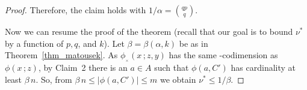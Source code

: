 \documentclass[scombinatorics.tex]{subfiles}
\begin{document}
\begin{proof}

Therefore, the claim holds with $\displaystyle1/\alpha={qp\choose q}$.

Now we can resume the proof of the theorem (recall that our goal is to bound $\nu^*$ by a function of $p,q$, and $k$).
Let $\beta=\beta(\alpha,k)$ be as in Theorem~\ref{thm_matousek}.
As $\phi\!_{_\times}\!(x\,;z,y)$ has the same \vc-codimension as $\phi(x\,;z)$, by Claim~2 there is an $a\in A$ such that $\phi(a,C')$ has cardinality at least $\beta\,n$. So, from $\beta\,n\le |\phi(a,C')|\le m$ we obtain $\nu^*\le 1/\beta$.
\end{proof}
\end{document}
